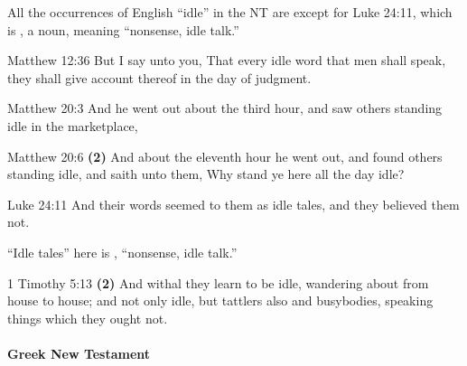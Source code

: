 			All the occurrences of English ``idle'' in the NT are \hyperref[ARGOS]{} except for Luke 24:11, which is , a noun, meaning ``nonsense, idle talk.''
			
			\begin{compactdesc}
				\item[Matthew 12:36] But I say unto you, That every idle word that men shall speak, they shall give account thereof in the day of judgment.
				\item[Matthew 20:3] And he went out about the third hour, and saw others standing idle in the marketplace,
				\item[Matthew 20:6] \textbf{(2)} And about the eleventh hour he went out, and found others standing idle, and saith unto them, Why stand ye here all the day idle?
				\item[Luke 24:11] And their words seemed to them as idle tales, and they believed them not.
					\begin{compactitem}
						\item ``Idle tales'' here is , ``nonsense, idle talk.''
					\end{compactitem}
				\item[1 Timothy 5:13] \textbf{(2)} And withal they learn to be idle, wandering about from house to house; and not only idle, but tattlers also and busybodies, speaking things which they ought not.
			\end{compactdesc}
			
		\paragraph{Greek New Testament} %
			\label{IDLENESS-GREEK}
		
			\subparagraph{\texorpdfstring{}{}}
				\label{ARGOS}
			
